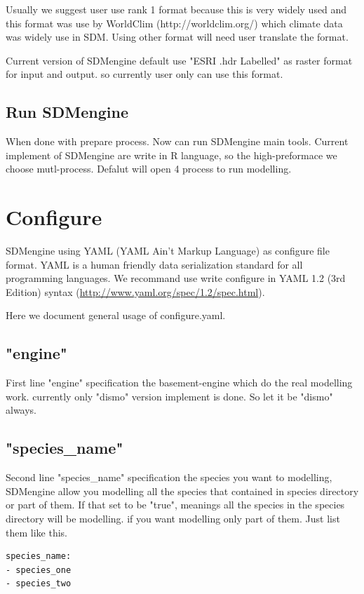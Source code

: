 \documentclass[10pt,a4paper]{report}
\begin{document}
Usually we suggest user use rank 1 format because this is very widely used and this format was use by WorldClim (http://worldclim.org/) which climate data was widely use in SDM. Using other format will need user translate the format.

Current version of SDMengine default use "ESRI .hdr Labelled" as raster format for input and output. so currently user only can use this format.

\subsection{Run SDMengine}
When done with prepare process. Now can run SDMengine main tools. Current implement of SDMengine are write in R language, so the high-preformace we choose mutl-process. Defalut will open 4 process to run modelling.

\section{Configure}
SDMengine using YAML (YAML Ain't Markup Language) as configure file format. YAML is a human friendly data serialization standard for all programming languages. We recommand use write configure in YAML 1.2 (3rd Edition) syntax (\url{http://www.yaml.org/spec/1.2/spec.html}).

Here we document general usage of configure.yaml.



\subsection{"engine"}
First line "engine" specification the basement-engine which do the real modelling work. currently only "dismo" version implement is done. So let it be "dismo" always.

\subsection{"species\_name"}
Second line "species\_name" specification the species you want to modelling, SDMengine allow you modelling all the species that contained in species directory or part of them. If that set to be "true", meanings all the species in the species directory will be modelling. if you want modelling only part of them. Just list them like this.

\begin{lstlisting}
species_name:
- species_one
- species_two
\end{lstlisting}
\end{document}
